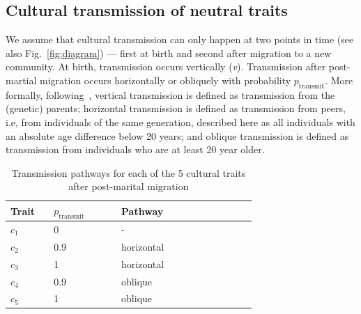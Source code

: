 \documentclass[9pt,twocolumn,twoside,lineno]{pnas-new}
\begin{document}
\subsection*{Cultural transmission of neutral traits}

We assume that cultural transmission can only happen at two points in time (see also Fig.~\ref{fig:diagram}) --- first at birth and second after migration to a new community. 
At birth, transmission occurs vertically (\textit{v}).
Transmission after post-martial migration occurs horizontally or obliquely with probability $p_\text{transmit}$.
More formally, following~\citep{cavalli1981cultural}, vertical transmission is defined as transmission from the (genetic) parents; horizontal transmission is defined as transmission from peers, i.e, from individuals of the same generation, described here as all individuals with an absolute age difference below 20 years; and oblique transmission is defined as transmission from individuals who are at least 20 year older. 


\begin{table}[htp]
\centering
\caption{Transmission pathways for each of the 5 cultural traits after post-marital migration}
\begin{tabular}{p{0.1\linewidth} | p{0.2\linewidth} |  p{0.4\linewidth}}
Trait & $p_\text{transmit}$ & Pathway \\
\hline
$c_1$ & 0 &  - \\
$c_2$ & 0.9 & horizontal\\
$c_3$ & 1 & horizontal\\
$c_4$ & 0.9 & oblique\\
$c_5$ & 1 & oblique\\
\end{tabular}
\label{tab:transCombinations} 
\end{table}
\end{document}
